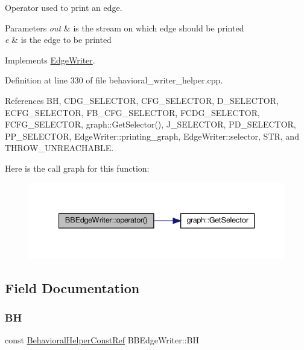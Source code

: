 Operator used to print an edge. 


\begin{DoxyParams}{Parameters}
{\em out} & is the stream on which edge should be printed \\
\hline
{\em e} & is the edge to be printed \\
\hline
\end{DoxyParams}


Implements \hyperlink{classEdgeWriter_a04dc5b68a11dcf253e21d29dfd1e06c3}{Edge\+Writer}.



Definition at line 330 of file behavioral\+\_\+writer\+\_\+helper.\+cpp.



References BH, C\+D\+G\+\_\+\+S\+E\+L\+E\+C\+T\+OR, C\+F\+G\+\_\+\+S\+E\+L\+E\+C\+T\+OR, D\+\_\+\+S\+E\+L\+E\+C\+T\+OR, E\+C\+F\+G\+\_\+\+S\+E\+L\+E\+C\+T\+OR, F\+B\+\_\+\+C\+F\+G\+\_\+\+S\+E\+L\+E\+C\+T\+OR, F\+C\+D\+G\+\_\+\+S\+E\+L\+E\+C\+T\+OR, F\+C\+F\+G\+\_\+\+S\+E\+L\+E\+C\+T\+OR, graph\+::\+Get\+Selector(), J\+\_\+\+S\+E\+L\+E\+C\+T\+OR, P\+D\+\_\+\+S\+E\+L\+E\+C\+T\+OR, P\+P\+\_\+\+S\+E\+L\+E\+C\+T\+OR, Edge\+Writer\+::printing\+\_\+graph, Edge\+Writer\+::selector, S\+TR, and T\+H\+R\+O\+W\+\_\+\+U\+N\+R\+E\+A\+C\+H\+A\+B\+LE.

Here is the call graph for this function\+:
\nopagebreak
\begin{figure}[H]
\begin{center}
\leavevmode
\includegraphics[width=340pt]{d8/d74/classBBEdgeWriter_a9f9d0af976dfe274cc81eecd9c28d832_cgraph}
\end{center}
\end{figure}


\subsection{Field Documentation}
\mbox{\label{classBBEdgeWriter_afdef315282fd8c5241421ef50143536f}} 
\subsubsection{\texorpdfstring{BH}{BH}}
{\footnotesize\ttfamily const \hyperlink{behavioral__helper_8hpp_aae973b54cac87eef3b27442aa3e1e425}{Behavioral\+Helper\+Const\+Ref} B\+B\+Edge\+Writer\+::\+BH\hspace{0.3cm}{\ttfamily [private]}}




